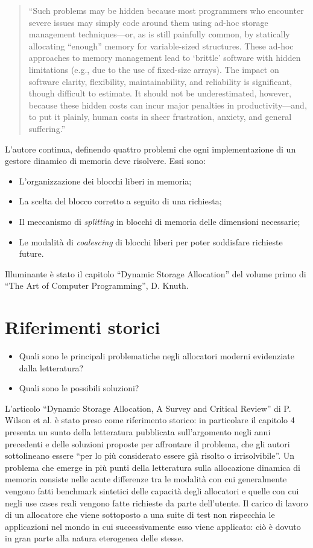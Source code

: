 \documentclass[noexaminfo]{sapthesis}
\begin{document}
\begin{quote}
``Such problems may be hidden because most programmers who encounter severe issues may simply code around them using ad-hoc storage management techniques—or, as is still painfully common, by statically allocating ``enough'' memory for variable-sized structures. These ad-hoc approaches to memory management lead to ‘brittle’ software with hidden limitations (e.g., due to the use of fixed-size arrays). The impact on software clarity, flexibility, maintainability, and reliability is significant, though difficult to estimate. It should not be underestimated, however, because these hidden costs can incur major penalties in productivity—and, to put it plainly, human costs in sheer frustration, anxiety, and general suffering.''
\end{quote}

L’autore continua, definendo quattro problemi che ogni implementazione di un gestore dinamico di memoria deve risolvere. Essi sono:
\begin{itemize}
  \item L’organizzazione dei blocchi liberi in memoria;
  \item La scelta del blocco corretto a seguito di una richiesta;
  \item Il meccanismo di \textit{splitting} in blocchi di memoria delle dimensioni necessarie;
  \item Le modalità di \textit{coalescing} di blocchi liberi per poter soddisfare richieste future.
\end{itemize}

Illuminante è stato il capitolo ``Dynamic Storage Allocation'' del volume primo di ``The Art of Computer Programming'', D. Knuth.

\section{Riferimenti storici}
\begin{itemize}
  \item Quali sono le principali problematiche negli allocatori moderni evidenziate dalla letteratura?
  \item Quali sono le possibili soluzioni?
\end{itemize}

L’articolo ``Dynamic Storage Allocation, A Survey and Critical Review'' di P. Wilson et al. è stato preso come riferimento storico: in particolare il capitolo 4 presenta un sunto della letteratura pubblicata sull’argomento negli anni precedenti e delle soluzioni proposte per affrontare il problema, che gli autori sottolineano essere ``per lo più considerato essere già risolto o irrisolvibile''. Un problema che emerge in più punti della letteratura sulla allocazione dinamica di memoria consiste nelle acute differenze tra le modalità con cui generalmente vengono fatti benchmark sintetici delle capacità degli allocatori e quelle con cui negli use cases reali vengono fatte richieste da parte dell’utente. Il carico di lavoro di un allocatore che viene sottoposto a una suite di test non rispecchia le applicazioni nel mondo in cui successivamente esso viene applicato: ciò è dovuto in gran parte alla natura eterogenea delle stesse.
\end{document}
